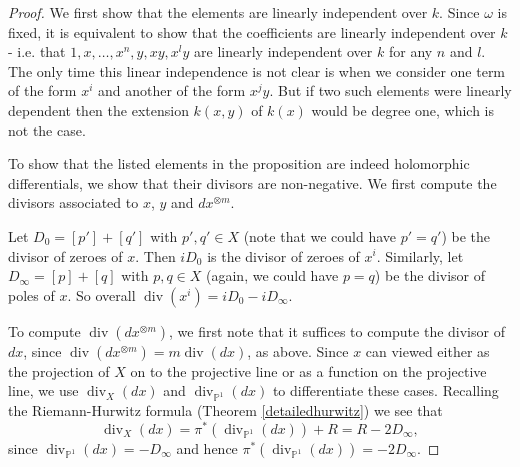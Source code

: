 \documentclass[11pt]{article} %
\theoremstyle{plain}
\theoremstyle{remark}
\DeclareMathOperator{\ord}{ord}
\DeclareMathOperator{\di}{div}
\begin{document}
\begin{proof}
We first show that the elements are linearly independent over $k$.
Since $\omega$ is fixed, it is equivalent to show that the coefficients are linearly independent over $k$ - i.e. that $1,x,\ldots ,x^n, y, xy, x^ly$ are linearly independent over $k$ for any $n$ and $l$.
The only time this linear independence is not clear is when we consider one term of the form $x^i$ and another of the form $x^jy$.
But if two such elements were linearly dependent then the extension $k(x,y)$ of $k(x)$ would be degree one, which is not the case.

To show that the listed elements in the proposition are indeed holomorphic differentials, we show that their divisors are non-negative.
We first compute the divisors associated to $x$, $y$ and $dx^{\otimes m}$.
\begin{comment}
For any $f\in K(X)$ we will denote by $(f)_0$ and $(f)_\infty$ the divisor of zeroes and divisor of poles of $f$ respectively.
In particular, 
\[
          (f)_0 := \sum_{\{P\in X|\ord_P(f)>0\}}\ord_P(f)[P],      
 \]
 and 
 \[
 (f)_\infty = \sum_{\{P\in X |\ord_P(f)<0\}} -\ord_P(f)[P].
 \]
\end{comment}

Let $D_0 = [p']+[q']$ with $p',q' \in X$ (note that we could have $p' = q'$) be the divisor of zeroes of $x$. 
Then $ i D_0$ is the divisor of zeroes of $x^i$. 
Similarly, let $D_\infty = [p] + [q]$ with $p, q \in X$ (again, we could have $p=q$) be the divisor of poles of $x$. 
So overall $\di (x^i) = i D_0 - i D_\infty$.


To compute $\di (dx^{\otimes m})$, we first note that it suffices to compute the divisor of $dx$, since $\di (dx^{\otimes m}) =m\di (dx)$, as above.
Since $x$ can viewed either as the projection of $X$ on to the projective line or as a function on the projective line, we use $\di_X (dx)$ and $\di_{\mathbb P^1} (dx)$ to differentiate these cases.
Recalling the Riemann-Hurwitz formula (Theorem \ref{detailedhurwitz}) we see that
\[
 \di_X (dx) = \pi^*( \di_{\mathbb P^1}(dx)) + R = R - 2D_{\infty},
\]
since $\di_{\mathbb P^1}(dx) = -D_\infty$ and hence $\pi^* (\di_{\mathbb P^1}(dx)) = -2D_\infty$.


\end{proof}
\end{document}
